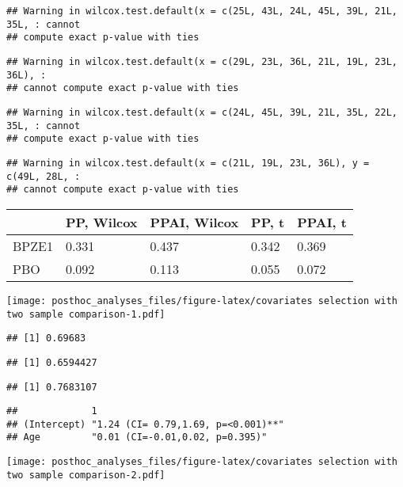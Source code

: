 \documentclass[
]{article}
\begin{document}
\begin{verbatim}
## Warning in wilcox.test.default(x = c(25L, 43L, 24L, 45L, 39L, 21L, 35L, : cannot
## compute exact p-value with ties
\end{verbatim}

\begin{verbatim}
## Warning in wilcox.test.default(x = c(29L, 23L, 36L, 21L, 19L, 23L, 36L), :
## cannot compute exact p-value with ties
\end{verbatim}

\begin{verbatim}
## Warning in wilcox.test.default(x = c(24L, 45L, 39L, 21L, 35L, 22L, 35L, : cannot
## compute exact p-value with ties
\end{verbatim}

\begin{verbatim}
## Warning in wilcox.test.default(x = c(21L, 19L, 23L, 36L), y = c(49L, 28L, :
## cannot compute exact p-value with ties
\end{verbatim}

\begin{tabular}{l|l|l|l|l}
\hline
  & PP, Wilcox & PPAI, Wilcox & PP, t & PPAI, t\\
\hline
BPZE1 & 0.331 & 0.437 & 0.342 & 0.369\\
\hline
PBO & 0.092 & 0.113 & 0.055 & 0.072\\
\hline
\end{tabular}

\texttt{[image: posthoc\_analyses\_files/figure-latex/covariates selection with two sample comparison-1.pdf]}

\begin{verbatim}
## [1] 0.69683
\end{verbatim}

\begin{verbatim}
## [1] 0.6594427
\end{verbatim}

\begin{verbatim}
## [1] 0.7683107
\end{verbatim}

\begin{verbatim}
##             1                                 
## (Intercept) "1.24 (CI= 0.79,1.69, p=<0.001)**"
## Age         "0.01 (CI=-0.01,0.02, p=0.395)"
\end{verbatim}

\texttt{[image: posthoc\_analyses\_files/figure-latex/covariates selection with two sample comparison-2.pdf]}
\end{document}
